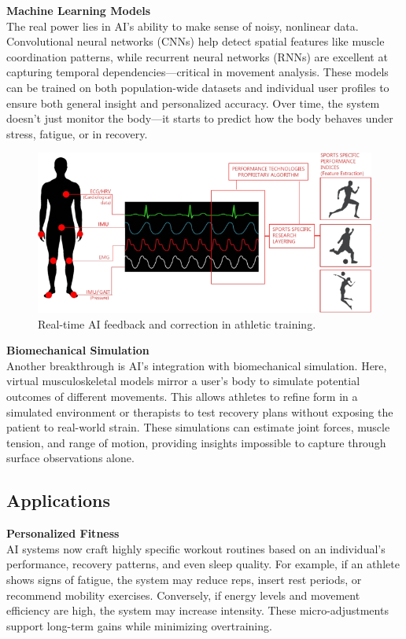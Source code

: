 \documentclass[a4paper,10pt,twocolumn]{memoir}
\newcommand{\highlight}[1]{\textcolor{accent}{\textbf{#1}}}
\newcommand{\highlight}[1]{\textcolor{accent}{\textbf{#1}}}
\begin{document}
\highlight{Machine Learning Models} \\
The real power lies in AI's ability to make sense of noisy, nonlinear data. Convolutional neural networks (CNNs) help detect spatial features like muscle coordination patterns, while recurrent neural networks (RNNs) are excellent at capturing temporal dependencies—critical in movement analysis. These models can be trained on both population-wide datasets and individual user profiles to ensure both general insight and personalized accuracy. Over time, the system doesn't just monitor the body—it starts to predict how the body behaves under stress, fatigue, or in recovery.

\begin{figure}[H]
  \centering
  \includegraphics[width=\linewidth]{ai_sensors.png}
  \caption{Real-time AI feedback and correction in athletic training.}
  \label{fig:ai_sports}
\end{figure}
\highlight{Biomechanical Simulation} \\
Another breakthrough is AI's integration with biomechanical simulation. Here, virtual musculoskeletal models mirror a user's body to simulate potential outcomes of different movements. This allows athletes to refine form in a simulated environment or therapists to test recovery plans without exposing the patient to real-world strain. These simulations can estimate joint forces, muscle tension, and range of motion, providing insights impossible to capture through surface observations alone.



\subsection*{Applications}
\highlight{Personalized Fitness} \\
AI systems now craft highly specific workout routines based on an individual's performance, recovery patterns, and even sleep quality. For example, if an athlete shows signs of fatigue, the system may reduce reps, insert rest periods, or recommend mobility exercises. Conversely, if energy levels and movement efficiency are high, the system may increase intensity. These micro-adjustments support long-term gains while minimizing overtraining.
\end{document}
